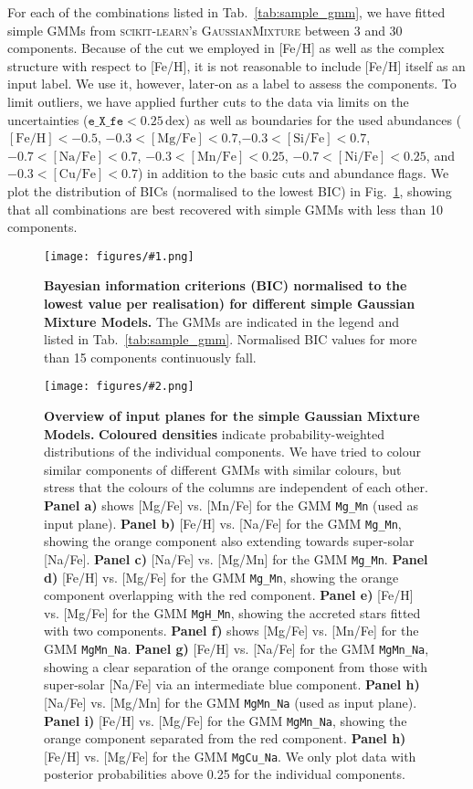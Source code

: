 \documentclass[fleqn,usenatbib]{mnras}
\newcommand{\dex}{\,\mathrm{dex}}	%
\newcommand{\codeicon}{{\faCloudDownload}}
\newcommand{\codelink}[1]{\href{https://github.com/svenbuder/buder_galah_accreted_chemistry/tree/main/figures/#1.ipynb}{\codeicon}\,\,}
\newcommand{\oscaption}[2]{\caption{#2 \codelink{#1}}}
\newcommand{\figuretextwidth}[4]{\begin{figure*} \centering \texttt{[image: figures/\#2.png]}\oscaption{#3}{#4}\label{fig:#2} \end{figure*}}
\newcommand{\figurecolumnwidth}[3]{\begin{figure} \centering \texttt{[image: figures/\#1.png]}\oscaption{#2}{#3}\label{fig:#1} \end{figure}}
\begin{document}
For each of the combinations listed in Tab.~\ref{tab:sample_gmm}, we have fitted simple GMMs from \textsc{scikit-learn}'s \textsc{GaussianMixture} between 3 and 30 components. Because of the cut we employed in [Fe/H] as well as the complex structure with respect to [Fe/H], it is not reasonable to include [Fe/H] itself as an input label. We use it, however, later-on as a label to assess the components. To limit outliers, we have applied further cuts to the data via limits on the uncertainties ($\texttt{e\_X\_fe} < 0.25\dex$) as well as boundaries for the used abundances ($ \mathrm{[Fe/H]} < -0.5 $, $-0.3 < \mathrm{[Mg/Fe]} < 0.7$,$ -0.3 < \mathrm{[Si/Fe]} < 0.7$, $ -0.7 < \mathrm{[Na/Fe]} < 0.7$, $ -0.3 < \mathrm{[Mn/Fe]} < 0.25$, $ -0.7 < \mathrm{[Ni/Fe]} < 0.25$, and $ -0.3 < \mathrm{[Cu/Fe]} < 0.7$) in addition to the basic cuts and abundance flags. We plot the distribution of BICs (normalised to the lowest BIC) in Fig.~\ref{fig:bic_stats}, showing that all combinations are best recovered with simple GMMs with less than 10 components.

\figurecolumnwidth{bic_stats}{gaussian_mixture_models}{
\textbf{Bayesian information criterions (BIC) normalised to the lowest value per realisation) for different simple Gaussian Mixture Models.} The GMMs are indicated in the legend and listed in Tab.~\ref{tab:sample_gmm}. Normalised BIC values for more than 15 components continuously fall.
}



\figuretextwidth{17cm}{best_gmm_samplings_selection}{gaussian_mixture_models}{
\textbf{Overview of input planes for the simple Gaussian Mixture Models.}
\textbf{Coloured densities} indicate probability-weighted distributions of the individual components. We have tried to colour similar components of different GMMs with similar colours, but stress that the colours of the columns are independent of each other.
\textbf{Panel a)} shows [Mg/Fe] vs. [Mn/Fe] for the GMM \texttt{Mg\_Mn} (used as input plane).
\textbf{Panel b)} [Fe/H] vs. [Na/Fe] for the GMM \texttt{Mg\_Mn}, showing the orange component also extending towards super-solar [Na/Fe].
\textbf{Panel c)} [Na/Fe] vs. [Mg/Mn] for the GMM \texttt{Mg\_Mn}.
\textbf{Panel d)} [Fe/H] vs. [Mg/Fe] for the GMM \texttt{Mg\_Mn}, showing the orange component overlapping with the red component.
\textbf{Panel e)} [Fe/H] vs. [Mg/Fe] for the GMM \texttt{MgH\_Mn}, showing the accreted stars fitted with two components.
\textbf{Panel f)} shows [Mg/Fe] vs. [Mn/Fe] for the GMM \texttt{MgMn\_Na}.
\textbf{Panel g)} [Fe/H] vs. [Na/Fe] for the GMM \texttt{MgMn\_Na}, showing a clear separation of the orange component from those with super-solar [Na/Fe] via an intermediate blue component.
\textbf{Panel h)} [Na/Fe] vs. [Mg/Mn] for the GMM \texttt{MgMn\_Na} (used as input plane).
\textbf{Panel i)} [Fe/H] vs. [Mg/Fe] for the GMM \texttt{MgMn\_Na}, showing the orange component separated from the red component.
\textbf{Panel h)} [Fe/H] vs. [Mg/Fe] for the GMM \texttt{MgCu\_Na}.
We only plot data with posterior probabilities above 0.25 for the individual components.
}
\end{document}
